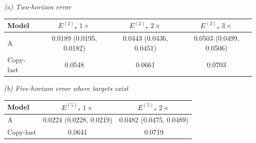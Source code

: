 {\small\textit{(a) Two-horizon error}}\par\vspace{2pt}
\par\begingroup\centering\fontsize{8.5}{10.5}\selectfont\setlength{\parskip}{0pt}\setlength{\tabcolsep}{4pt}
\begin{tabular}{@{}lccc@{}}
\toprule
Model & $E^{(2)}$, $1\times$ & $E^{(2)}$, $2\times$ & $E^{(2)}$, $3\times$ \\
\midrule
A & 0.0189 (0.0195, 0.0182) & 0.0443 (0.0436, 0.0451) & 0.0503 (0.0499, 0.0506) \\
Copy-last & 0.0548 & 0.0661 & 0.0703 \\
\bottomrule
\end{tabular}\par\endgroup\vspace{5pt}
{\small\textit{(b) Five-horizon error where targets exist}}\par\vspace{2pt}
\par\begingroup\centering\fontsize{8.5}{10.5}\selectfont\setlength{\parskip}{0pt}\setlength{\tabcolsep}{4pt}
\begin{tabular}{@{}lcc@{}}
\toprule
Model & $E^{(5)}$, $1\times$ & $E^{(5)}$, $2\times$ \\
\midrule
A & 0.0224 (0.0228, 0.0219) & 0.0482 (0.0475, 0.0489) \\
Copy-last & 0.0641 & 0.0719 \\
\bottomrule
\end{tabular}\par\endgroup\vspace{5pt}
